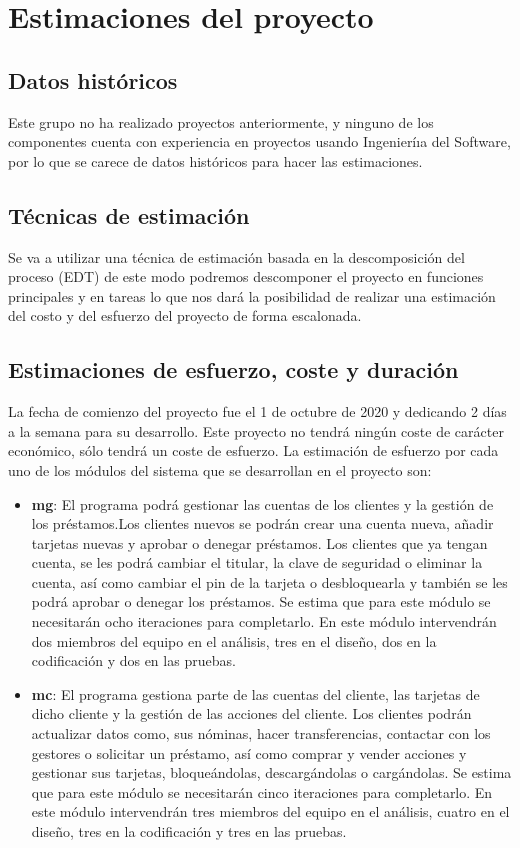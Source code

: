 \section{Estimaciones del proyecto}
\subsection{Datos históricos}
Este grupo no ha realizado proyectos anteriormente, y ninguno de los componentes
cuenta con experiencia en proyectos usando Ingenieríıa del Software, por lo que se carece
de datos históricos para hacer las estimaciones.
\subsection{Técnicas de estimación}
Se va a utilizar una técnica de estimación basada en la descomposición del proceso
(EDT) de este modo podremos descomponer el proyecto en funciones principales y en tareas
lo que nos dará la posibilidad de realizar una estimación del costo y del esfuerzo del proyecto
de forma escalonada.

\subsection{Estimaciones de esfuerzo, coste y duración}
La fecha de comienzo del proyecto fue el 1 de octubre de 2020 y dedicando 2 días a la semana para su desarrollo. Este proyecto no tendrá ningún coste de carácter económico, sólo tendrá un coste de esfuerzo.
La estimación de esfuerzo por cada uno de los módulos del sistema que se desarrollan en el proyecto son:
\begin{itemize}
	\item \textbf{\gls{mg}}: El programa podrá gestionar las cuentas de los clientes  y la gestión de los préstamos.Los clientes nuevos se  podrán crear una cuenta nueva,  añadir tarjetas nuevas  y aprobar o denegar préstamos. Los clientes que ya tengan cuenta, se les podrá cambiar el titular, la clave de seguridad o eliminar la cuenta, así como cambiar el pin de la tarjeta o desbloquearla y también se les podrá aprobar o denegar los préstamos. Se estima que para este módulo se necesitarán ocho iteraciones para completarlo. En este módulo intervendrán dos miembros del equipo en el análisis, tres en el diseño, dos en la codificación y dos en las pruebas.
	\item \textbf{\gls{mc}}: El programa gestiona parte de las cuentas del cliente,  las tarjetas de dicho cliente y la gestión de las acciones del cliente. Los clientes podrán actualizar datos como, sus nóminas, hacer transferencias, contactar con los gestores o solicitar un préstamo, así como  comprar y vender acciones y gestionar sus tarjetas, bloqueándolas, descargándolas o cargándolas. Se estima que para este módulo se necesitarán cinco iteraciones para completarlo. En este módulo intervendrán tres miembros del equipo en el análisis, cuatro en el diseño, tres en la codificación y tres en las pruebas.
\end{itemize}

